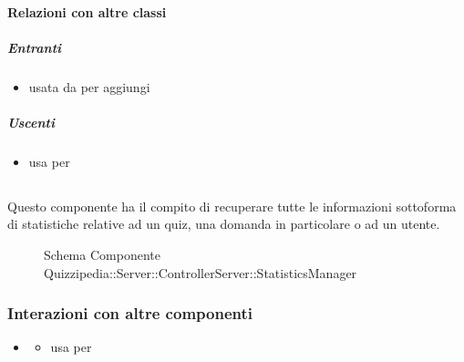 \paragraph{Relazioni con altre classi}
\subparagraph{Entranti}
\begin{itemize}
\item usata da  per aggiungi
\end{itemize}
\subparagraph{Uscenti}
\begin{itemize}
\item usa  per 
\end{itemize}
\subsection{}
Questo componente ha il compito di recuperare tutte le informazioni sottoforma di statistiche relative ad un quiz, una domanda in particolare o ad un utente.
\begin{figure}[H]
\centering
\noindent{}
\caption[Schema Componente Quizzipedia::Server::ControllerServer::StatisticsManager]{Schema Componente Quizzipedia::Server::ControllerServer::StatisticsManager}
\end{figure}
\subsubsection{Interazioni con altre componenti}
\begin{itemize}
\item {}
\begin{itemize}
\item usa  per 
\end{itemize}
\end{itemize}

